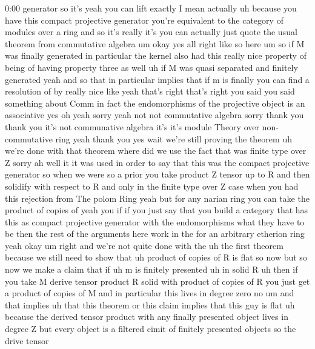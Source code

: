 \begin{unfinished}{0:00}
generator  so
it's  yeah  you  can
lift
exactly
I  mean  actually  uh  because  you  have  this
compact  projective  generator  you're
equivalent  to  the  category  of  modules
over  a  ring  and  so  it's  really  it's  you
can  actually  just  quote  the  usual
theorem  from  commutative
algebra  um  okay  yes  all  right  like  so
here  um  so  if  M  was  finally  generated  in
particular  the  kernel  also  had  this
really  nice  property  of  being  of  having
property  three  as  well  uh  if  M  was  quasi
separated  and  finitely  generated  yeah
and  so  that  in  particular  implies  that
if  m  is  finally  you  can  find  a
resolution  of  by  really  nice  like  yeah
that's  right  that's
right  you  said  you  said  something  about
Comm  in  fact  the  endomorphisms  of  the
projective  object  is  an  associative  yes
oh  yeah  sorry  yeah  not  not  commutative
algebra  sorry  thank  you  thank  you  it's
not  communative  algebra  it's  it's  module
Theory  over  non-commutative  ring  yeah
thank  you
yes
wait  we're  still  proving  the  theorem  uh
we're  done  with  that  theorem  where  did
we  use  the  fact  that  was  finite  type
over  Z
sorry  ah  well  it  it  was  used  in  order  to
say  that  this  was  the  compact  projective
generator  so  when  we  were  so  a  prior  you
take  product  Z  tensor  up  to  R  and  then
solidify  with  respect  to  R  and  only  in
the  finite  type  over  Z  case  when  you  had
this  rejection  from  The  polom  Ring  yeah
but  for  any  narian  ring  you  can  take  the
product  of  copies  of  yeah  you  if  if  you
just  say  that  you  build  a  category  that
has  this  as  compact  projective  generator
with  the  endomorphisms  what  they  have  to
be  then  the  rest  of  the  arguments  here
work  in  the  for  an  arbitrary  etherion
ring
yeah
okay  um  right  and  we're  not  quite  done
with  the  uh  the  first  theorem  because  we
still  need  to  show  that  uh  product  of
copies  of  R  is  flat  so  now  but  so  now  we
make  a  claim  that  if  uh
m  is  finitely
presented
uh  in  solid
R  uh  then  if  you  take  M  derive  tensor
product  R  solid  with  product  of  copies
of  R  you  just  get  a  product  of  copies  of
M  and  in  particular  this  lives  in  degree
zero
no  um  and  that  implies  uh  that  this
theorem  or  this  claim  implies  that  this
guy  is
flat  uh  because  the  derived  tensor
product  with  any  finally  presented
object  lives  in  degree  Z  but  every
object  is  a  filtered  cimit  of  finitely
presented  objects  so  the  drive  tensor

\end{unfinished}
